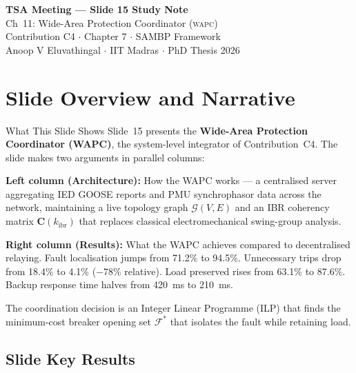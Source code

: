 \documentclass[12pt,a4paper]{article}
\newcommand{\kibr}{k_\mathrm{ibr}}
\newcommand{\WAPC}{\textsc{wapc}}
\begin{document}
\begin{tcolorbox}[colback=iitmnavy,coltext=white,arc=4pt,boxrule=0pt]
\begin{center}
  {\Large\bfseries TSA Meeting --- Slide 15 Study Note}\\[4pt]
  {\large Ch~11: Wide-Area Protection Coordinator (\WAPC{})}\\[6pt]
  {\normalsize Contribution C4 $\cdot$ Chapter 7 $\cdot$ SAMBP Framework}\\[2pt]
  {\small Anoop V Eluvathingal $\cdot$ IIT Madras $\cdot$ PhD Thesis 2026}
\end{center}
\end{tcolorbox}

\vspace{6pt}

\section{Slide Overview and Narrative}

\begin{keybox}{What This Slide Shows}
Slide~15 presents the \textbf{Wide-Area Protection Coordinator (WAPC)}, the system-level integrator of Contribution~C4. The slide makes two arguments in parallel columns:

\textbf{Left column (Architecture):} How the WAPC works — a centralised server aggregating IED GOOSE reports and PMU synchrophasor data across the network, maintaining a live topology graph $\mathcal{G}(V,E)$ and an IBR coherency matrix $\mathbf{C}(\kibr)$ that replaces classical electromechanical swing-group analysis.

\textbf{Right column (Results):} What the WAPC achieves compared to decentralised relaying. Fault localisation jumps from 71.2\% to 94.5\%. Unnecessary trips drop from 18.4\% to 4.1\% ($-78\%$ relative). Load preserved rises from 63.1\% to 87.6\%. Backup response time halves from 420~ms to 210~ms.

The coordination decision is an Integer Linear Programme (ILP) that finds the minimum-cost breaker opening set $\mathcal{F}^*$ that isolates the fault while retaining load.
\end{keybox}

\subsection{Slide Key Results}
\end{document}
